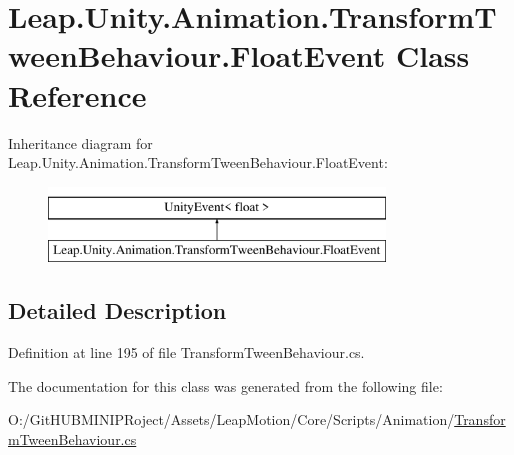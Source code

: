 \hypertarget{class_leap_1_1_unity_1_1_animation_1_1_transform_tween_behaviour_1_1_float_event}{}\section{Leap.\+Unity.\+Animation.\+Transform\+Tween\+Behaviour.\+Float\+Event Class Reference}
\label{class_leap_1_1_unity_1_1_animation_1_1_transform_tween_behaviour_1_1_float_event}
Inheritance diagram for Leap.\+Unity.\+Animation.\+Transform\+Tween\+Behaviour.\+Float\+Event\+:\begin{figure}[H]
\begin{center}
\leavevmode
\includegraphics[height=2.000000cm]{class_leap_1_1_unity_1_1_animation_1_1_transform_tween_behaviour_1_1_float_event}
\end{center}
\end{figure}


\subsection{Detailed Description}


Definition at line 195 of file Transform\+Tween\+Behaviour.\+cs.



The documentation for this class was generated from the following file\+:\begin{DoxyCompactItemize}
\item 
O\+:/\+Git\+H\+U\+B\+M\+I\+N\+I\+P\+Roject/\+Assets/\+Leap\+Motion/\+Core/\+Scripts/\+Animation/\mbox{\hyperlink{_transform_tween_behaviour_8cs}{Transform\+Tween\+Behaviour.\+cs}}\end{DoxyCompactItemize}
